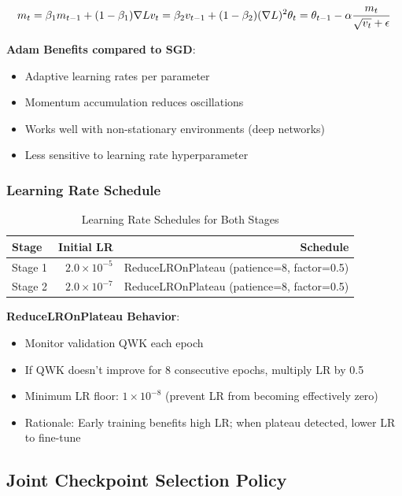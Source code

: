 \begin{equation}
m_t = \beta_1 m_{t-1} + (1-\beta_1) \nabla L \\
v_t = \beta_2 v_{t-1} + (1-\beta_2) (\nabla L)^2 \\
\theta_t = \theta_{t-1} - \alpha \frac{m_t}{\sqrt{v_t}+\epsilon}
\end{equation}

\textbf{Adam Benefits compared to SGD}:
\begin{itemize}
    \item Adaptive learning rates per parameter
    \item Momentum accumulation reduces oscillations
    \item Works well with non-stationary environments (deep networks)
    \item Less sensitive to learning rate hyperparameter
\end{itemize}

\subsubsection{Learning Rate Schedule}

\begin{table}[H]
\centering
\small
\caption{Learning Rate Schedules for Both Stages}
\begin{tabular}{|l|r|r|}
\hline
\textbf{Stage} & \textbf{Initial LR} & \textbf{Schedule} \\
\hline
Stage 1 & $2.0 \times 10^{-5}$ & ReduceLROnPlateau (patience=8, factor=0.5) \\
Stage 2 & $2.0 \times 10^{-7}$ & ReduceLROnPlateau (patience=8, factor=0.5) \\
\hline
\end{tabular}
\end{table}

\textbf{ReduceLROnPlateau Behavior}:
\begin{itemize}
    \item Monitor validation QWK each epoch
    \item If QWK doesn't improve for 8 consecutive epochs, multiply LR by 0.5
    \item Minimum LR floor: $1 \times 10^{-8}$ (prevent LR from becoming effectively zero)
    \item Rationale: Early training benefits high LR; when plateau detected, lower LR to fine-tune
\end{itemize}

\subsection{Joint Checkpoint Selection Policy}


